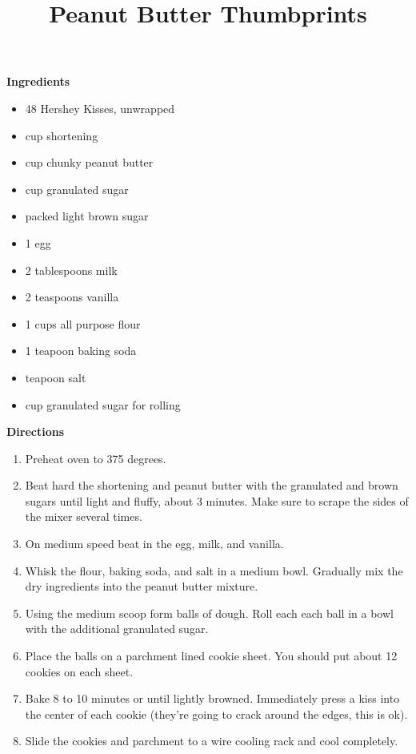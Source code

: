 \documentclass{article}
\title{Peanut Butter Thumbprints}
\begin{document}
\textbf{Ingredients}

\begin{itemize}
      \item 48 Hershey Kisses, unwrapped
      \item {} cup shortening
      \item {} cup chunky peanut butter
      \item {} cup granulated sugar
      \item {} packed light brown sugar
      \item 1 egg
      \item 2 tablespoons milk
      \item 2 teaspoons vanilla
      \item 1 cups all purpose flour
      \item 1 teapoon baking soda
      \item {} teapoon salt
      \item {} cup granulated sugar for rolling
\end{itemize}

\textbf{Directions}

\begin{enumerate}
      \item Preheat oven to 375 degrees.
      \item Beat hard the shortening and peanut butter with the granulated and brown sugars
            until light and fluffy, about 3 minutes. Make sure to scrape the sides of the
            mixer several times.
      \item On medium speed beat in the egg, milk, and vanilla.
      \item Whisk the flour, baking soda, and salt in a medium bowl. Gradually mix the dry ingredients
            into the peanut butter mixture.
      \item Using the medium scoop form balls of dough. Roll each each ball in a bowl with the
            additional granulated sugar.
      \item Place the balls on a parchment lined cookie sheet. You should put about 12 cookies
            on each sheet.
      \item Bake 8 to 10 minutes or until lightly browned. Immediately press a kiss into the center
            of each cookie (they're going to crack around the edges, this is ok).
      \item Slide the cookies and parchment to a wire cooling rack and cool completely.
\end{enumerate}


\end{document}
